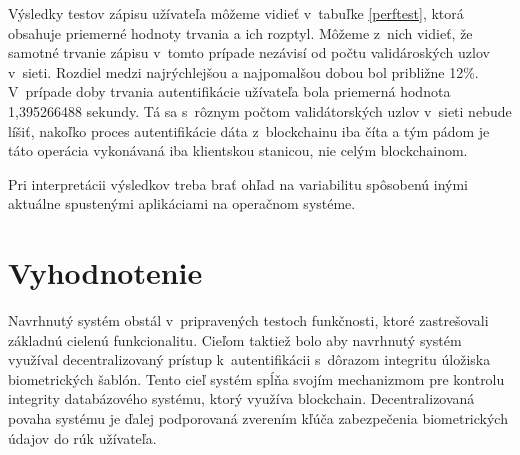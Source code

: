 Výsledky testov zápisu užívateľa môžeme vidieť v~tabuľke \ref{perftest}, ktorá obsahuje priemerné hodnoty trvania a ich rozptyl. Môžeme z~nich vidieť, že samotné trvanie zápisu v~tomto prípade nezávisí od počtu validároských uzlov v~sieti. Rozdiel medzi najrýchlejšou a najpomalšou dobou bol približne 12\%. V~prípade doby trvania autentifikácie užívateľa bola priemerná hodnota 1,395266488 sekundy. Tá sa s~rôznym počtom validátorských uzlov v~sieti nebude líšiť, nakoľko proces autentifikácie dáta z~blockchainu iba číta a tým pádom je táto operácia vykonávaná iba klientskou stanicou, nie celým blockchainom.

Pri interpretácii výsledkov treba brať ohľad na variabilitu spôsobenú inými aktuálne spustenými aplikáciami na operačnom systéme.

\begin{table}[h]
\caption{Výsledky merania výkonnosti}
\label{perftest}
\end{table}


\section{Vyhodnotenie}
Navrhnutý systém obstál v~pripravených testoch funkčnosti, ktoré zastrešovali základnú cielenú funkcionalitu. Cieľom taktiež bolo aby navrhnutý systém využíval decentralizovaný prístup k~autentifikácii s~dôrazom integritu úložiska biometrických šablón. Tento cieľ systém spĺňa svojím mechanizmom pre kontrolu integrity databázového systému, ktorý využíva blockchain. Decentralizovaná povaha systému je ďalej podporovaná zverením kľúča zabezpečenia biometrických údajov do rúk užívateľa.

